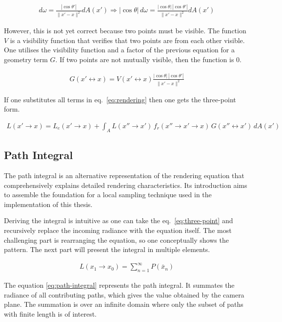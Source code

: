 \begin{align*}
d\omega=\frac{|\cos\theta'|}{\|x'-x\|^2}dA(x') \Rightarrow |\cos\theta|\,d\omega=\frac{|\cos\theta|\,|\cos\theta'|}{\|x'-x\|^2}dA(x')
\end{align*}

However, this is not yet correct because two points must be visible.
The function $V$ is a visibility function that verifies that two points are from each other visible.
One utilises the visibility function and a factor of the previous equation for a geometry term $G$. If two points are not mutually visible, then the function is 0.

\begin{align*}
G(x'\leftrightarrow x)=V(x'\leftrightarrow x)\frac{|\cos\theta|\,|\cos\theta'|}{\|x'-x\|^2}
\end{align*}

If one substitutes all terms in eq.~\ref{eq:rendering} then one gets the three-point form.

\begin{align}
L(x'\rightarrow x)=L_e(x'\rightarrow x)+\int_{A}L(x''\rightarrow x')\,f_r(x''\rightarrow x'\rightarrow x)\,G(x''\leftrightarrow x')\,dA(x')
\label{eq:three-point}
\end{align}

\subsection{Path Integral}

The path integral is an alternative representation of the rendering equation that comprehensively explains detailed rendering characteristics.
Its introduction aims to assemble the foundation for a local sampling technique used in the implementation of this thesis.

Deriving the integral is intuitive as one can take the eq.~\ref{eq:three-point} and recursively replace the incoming radiance with the equation itself.
The most challenging part is rearranging the equation, so one conceptually shows the pattern.
The next part will present the integral in multiple elements.

\begin{align}
L(x_1\rightarrow x_0)=\sum_{n=1}^\infty P(\bar{x}_n)
\label{eq:path-integral}
\end{align}

The equation \ref{eq:path-integral} represents the path integral.
It summates the radiance of all contributing paths, which gives the value obtained by the camera plane.
The summation is over an infinite domain where only the subset of paths with finite length is of interest.

